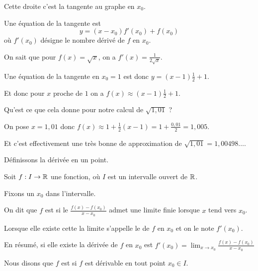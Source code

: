 \change

Cette droite c'est la tangente au graphe en $x_0$.

\change

Une équation de la tangente est 
$$y = (x-x_0) f'(x_0) + f(x_0)$$
où $f'(x_0)$ désigne le nombre dérivé de $f$ en $x_0$.

\change


On sait que pour $f(x)=\sqrt x$, on a $f'(x)=\frac{1}{2\sqrt x}$.

\change

Une équation de la tangente en $x_0=1$ est donc $y=(x-1)\frac12+1$.

\change

Et donc pour $x$ proche de $1$ on a $f(x) \approx (x-1)\frac12+1$.

\change


Qu'est ce que cela donne pour notre calcul de $\sqrt{1,01}$ ?


On pose $x=1,01$ donc $f(x) \approx 1+\frac12(x-1) = 1 + \frac{0,01}{2}=1,005$.

\change

Et c'est effectivement une très bonne de approximation de $\sqrt{1,01}=1,00498\ldots$.


\diapo

Définissons la dérivée en un point.

Soit $f : I \to \mathbb{R}$ une fonction, où $I$ est un intervalle ouvert de $\mathbb{R}$. 

Fixons un $x_0$ dans l'intervalle.

\change

On dit que $f$ est  si le 
 $\frac{f(x)-f(x_0)}{x-x_0}$ 
admet une limite finie lorsque $x$ tend vers $x_0$.

\change

Lorsque elle existe cette la limite s'appelle 
le  de $f$ en $x_0$ et on le note $f'(x_0)$. 

\change

En résumé, si elle existe 
la dérivée de $f$ en $x_0$ est
$\displaystyle f'(x_0)= \lim_{x\to x_0} \frac{f(x)-f(x_0)}{x-x_0}$

\diapo

Nous disons que $f$ est  si $f$ est dérivable en tout point $x_0 \in I$.

\change

